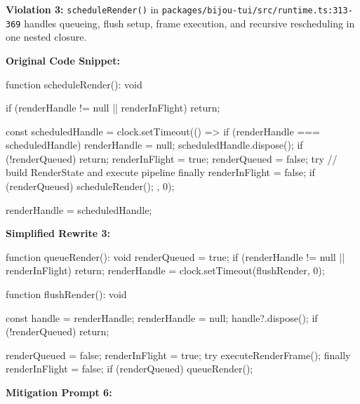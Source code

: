 \textbf{Violation 3:} \texttt{s\allowbreak{}c\allowbreak{}h\allowbreak{}e\allowbreak{}d\allowbreak{}u\allowbreak{}l\allowbreak{}e\allowbreak{}R\allowbreak{}e\allowbreak{}n\allowbreak{}d\allowbreak{}e\allowbreak{}r\allowbreak{}(\allowbreak{})} in \texttt{p\allowbreak{}a\allowbreak{}c\allowbreak{}k\allowbreak{}a\allowbreak{}g\allowbreak{}e\allowbreak{}s\allowbreak{}/\allowbreak{}b\allowbreak{}i\allowbreak{}j\allowbreak{}o\allowbreak{}u\allowbreak{}-\allowbreak{}t\allowbreak{}u\allowbreak{}i\allowbreak{}/\allowbreak{}s\allowbreak{}r\allowbreak{}c\allowbreak{}/\allowbreak{}r\allowbreak{}u\allowbreak{}n\allowbreak{}t\allowbreak{}i\allowbreak{}m\allowbreak{}e\allowbreak{}.\allowbreak{}t\allowbreak{}s\allowbreak{}:\allowbreak{}3\allowbreak{}1\allowbreak{}3\allowbreak{}-\allowbreak{}3\allowbreak{}6\allowbreak{}9} handles queueing, flush setup, frame execution, and recursive rescheduling in one nested closure.

\textbf{Original Code Snippet:}

\begin{CodeBlock}
function scheduleRender(): void {
  if (renderHandle != null || renderInFlight) return;

  const scheduledHandle = clock.setTimeout(() => {
    if (renderHandle === scheduledHandle) {
      renderHandle = null;
    }
    scheduledHandle.dispose();
    if (!renderQueued) return;
    renderInFlight = true;
    renderQueued = false;
    try {
      // build RenderState and execute pipeline
    } finally {
      renderInFlight = false;
      if (renderQueued) scheduleRender();
    }
  }, 0);

  renderHandle = scheduledHandle;
}
\end{CodeBlock}

\textbf{Simplified Rewrite 3:}

\begin{CodeBlock}
function queueRender(): void {
  renderQueued = true;
  if (renderHandle != null || renderInFlight) return;
  renderHandle = clock.setTimeout(flushRender, 0);
}

function flushRender(): void {
  const handle = renderHandle;
  renderHandle = null;
  handle?.dispose();
  if (!renderQueued) return;

  renderQueued = false;
  renderInFlight = true;
  try {
    executeRenderFrame();
  } finally {
    renderInFlight = false;
    if (renderQueued) queueRender();
  }
}
\end{CodeBlock}

\textbf{Mitigation Prompt 6:}

